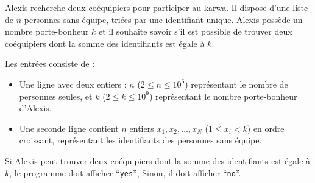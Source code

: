 \problemname{\problemyamlname}


\newcommand{\maxa}{123456789}

Alexis recherche deux coéquipiers pour participer au karwa. Il dispose d'une liste de $n$ personnes sans équipe, triées par une identifiant unique.
Alexis possède un nombre porte-bonheur $k$ et il souhaite savoir s'il est possible de trouver deux coéquipiers dont la somme des identifiants est égale à $k$.

\begin{Input}
	Les entrées consiste de : 
	\begin{itemize}
		 \item Une ligne avec deux entiers : $n$ ($2 \le n \le 10^6$) représentant le nombre de personnes seules, et $k$ ($2 \le k \le 10^9$) représentant le nombre porte-bonheur d'Alexis.
		\item Une seconde ligne contient $n$ entiers $x_1, x_2, \dots, x_N$ ($1 \le x_i < k$) en ordre croissant, représentant les identifiants des personnes sans équipe.
	\end{itemize}
\end{Input}

\begin{Output}
	Si Alexis peut trouver deux coéquipiers dont la somme des identifiants est égale à $k$, le programme doit afficher ``\verb|yes|'', Sinon, il doit afficher ``\verb|no|''.
\end{Output}
